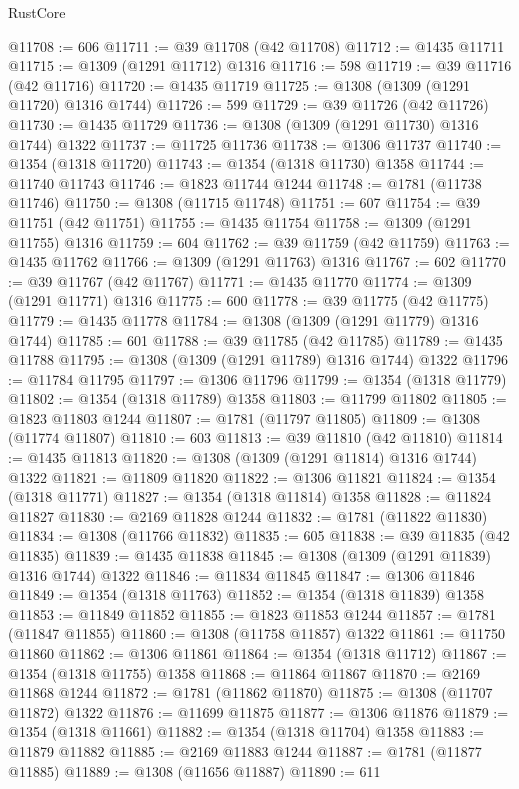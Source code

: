 \begin{lexlean}{RustCore}
\begin{coremodule}
@11708 := 606
@11711 := @39 @11708 (@42 @11708)
@11712 := @1435 @11711
@11715 := @1309 (@1291 @11712) @1316
@11716 := 598
@11719 := @39 @11716 (@42 @11716)
@11720 := @1435 @11719
@11725 := @1308 (@1309 (@1291 @11720) @1316 @1744)
@11726 := 599
@11729 := @39 @11726 (@42 @11726)
@11730 := @1435 @11729
@11736 := @1308 (@1309 (@1291 @11730) @1316 @1744) @1322
@11737 := @11725 @11736
@11738 := @1306 @11737
@11740 := @1354 (@1318 @11720)
@11743 := @1354 (@1318 @11730) @1358
@11744 := @11740 @11743
@11746 := @1823 @11744 @1244
@11748 := @1781 (@11738 @11746)
@11750 := @1308 (@11715 @11748)
@11751 := 607
@11754 := @39 @11751 (@42 @11751)
@11755 := @1435 @11754
@11758 := @1309 (@1291 @11755) @1316
@11759 := 604
@11762 := @39 @11759 (@42 @11759)
@11763 := @1435 @11762
@11766 := @1309 (@1291 @11763) @1316
@11767 := 602
@11770 := @39 @11767 (@42 @11767)
@11771 := @1435 @11770
@11774 := @1309 (@1291 @11771) @1316
@11775 := 600
@11778 := @39 @11775 (@42 @11775)
@11779 := @1435 @11778
@11784 := @1308 (@1309 (@1291 @11779) @1316 @1744)
@11785 := 601
@11788 := @39 @11785 (@42 @11785)
@11789 := @1435 @11788
@11795 := @1308 (@1309 (@1291 @11789) @1316 @1744) @1322
@11796 := @11784 @11795
@11797 := @1306 @11796
@11799 := @1354 (@1318 @11779)
@11802 := @1354 (@1318 @11789) @1358
@11803 := @11799 @11802
@11805 := @1823 @11803 @1244
@11807 := @1781 (@11797 @11805)
@11809 := @1308 (@11774 @11807)
@11810 := 603
@11813 := @39 @11810 (@42 @11810)
@11814 := @1435 @11813
@11820 := @1308 (@1309 (@1291 @11814) @1316 @1744) @1322
@11821 := @11809 @11820
@11822 := @1306 @11821
@11824 := @1354 (@1318 @11771)
@11827 := @1354 (@1318 @11814) @1358
@11828 := @11824 @11827
@11830 := @2169 @11828 @1244
@11832 := @1781 (@11822 @11830)
@11834 := @1308 (@11766 @11832)
@11835 := 605
@11838 := @39 @11835 (@42 @11835)
@11839 := @1435 @11838
@11845 := @1308 (@1309 (@1291 @11839) @1316 @1744) @1322
@11846 := @11834 @11845
@11847 := @1306 @11846
@11849 := @1354 (@1318 @11763)
@11852 := @1354 (@1318 @11839) @1358
@11853 := @11849 @11852
@11855 := @1823 @11853 @1244
@11857 := @1781 (@11847 @11855)
@11860 := @1308 (@11758 @11857) @1322
@11861 := @11750 @11860
@11862 := @1306 @11861
@11864 := @1354 (@1318 @11712)
@11867 := @1354 (@1318 @11755) @1358
@11868 := @11864 @11867
@11870 := @2169 @11868 @1244
@11872 := @1781 (@11862 @11870)
@11875 := @1308 (@11707 @11872) @1322
@11876 := @11699 @11875
@11877 := @1306 @11876
@11879 := @1354 (@1318 @11661)
@11882 := @1354 (@1318 @11704) @1358
@11883 := @11879 @11882
@11885 := @2169 @11883 @1244
@11887 := @1781 (@11877 @11885)
@11889 := @1308 (@11656 @11887)
@11890 := 611

\end{coremodule}
\end{lexlean}

